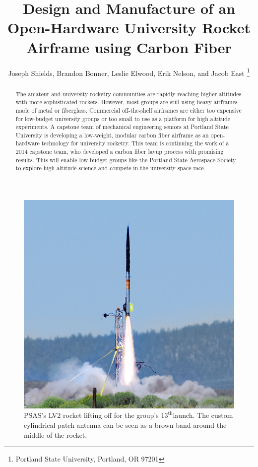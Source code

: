 \documentclass{aiaa-tc}%
\title{Design and Manufacture of an Open-Hardware 
 	University Rocket Airframe using Carbon Fiber}
\author{
Joseph Shields, Brandon Bonner, Leslie Elwood, Erik Nelson, and Jacob East
	\thanks{Portland State University, Portland, OR 97201}
 }
\begin{document}
\maketitle

\begin{abstract}
The amateur and university rocketry communities are rapidly reaching higher altitudes with more sophisticated rockets. However, most groups are still using heavy airframes made of metal or fiberglass. Commercial off-the-shelf airframes are either too expensive for low-budget university groups or too small to use as a platform for high altitude experiments. 
A capstone team of mechanical engineering seniors at Portland State University is developing a low-weight, modular carbon fiber airframe as an open-hardware technology for university rocketry. This team is continuing the work of a 2014 capstone team, who developed a carbon fiber layup process with promising results. 
This will enable low-budget groups like the Portland State Aerospace Society to explore high altitude science and compete in the university space race.  \end{abstract}

\begin{figure}
\centering
\includegraphics[width=\linewidth]{img/L12-cropped.png}
\caption{PSAS's LV2 rocket lifting off for the group's $13^\text{th}$launch. The custom cylindrical patch antenna can be seen as a brown band around the middle of the rocket.}
\label{fig:L-12}
\end{figure}
\end{document}

